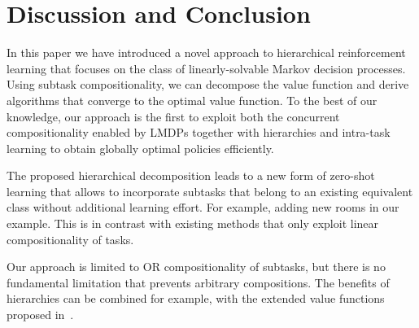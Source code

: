
\section{Discussion and Conclusion}

In this paper we have introduced a novel approach to hierarchical reinforcement learning that focuses on the class of linearly-solvable Markov decision processes.
Using subtask compositionality, we can decompose the value function and derive algorithms that converge to the optimal value function.
To the best of our knowledge, our approach is the first to exploit both the concurrent compositionality enabled by LMDPs together with hierarchies and intra-task learning to obtain globally optimal policies efficiently.

The proposed hierarchical decomposition leads to a new form of zero-shot learning that allows to incorporate subtasks that belong to an existing equivalent class without additional learning effort.
For example, adding new rooms in our example.
This is in contrast with existing methods that only exploit linear compositionality of tasks.

Our approach is limited to OR compositionality of subtasks, but there is no fundamental limitation that prevents arbitrary compositions.
The benefits of hierarchies can be combined for example, with the extended value functions proposed in~\citep{NangueTasse2020}.